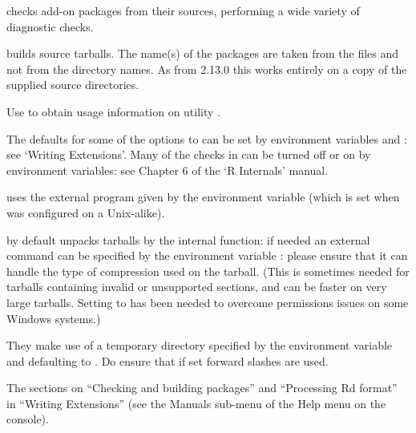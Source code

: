 %
\begin{Details}\relax
{}
checks \R{} add-on packages from their sources, performing a wide
variety of diagnostic checks.

 builds \R{} source tarballs.  The name(s) of the
packages are taken from the  files and not from the
directory names.  As from \R{} 2.13.0 this works entirely on a copy of
the supplied source directories.

Use  to obtain usage information on
utility .

The defaults for some of the options to  can be
set by environment variables  and
: see `Writing \R{} Extensions'.
Many of the checks in  can be turned off or on by
environment variables: see Chapter 6 of the `R Internals' manual.

 uses the external  program given by
the  environment variable (which is set when \R{} was
configured on a Unix-alike).

 by default unpacks tarballs by the internal
 function: if needed an external 
command can be specified by the environment variable
: please ensure that it can handle the type of
compression used on the tarball.  (This is sometimes needed for
tarballs containing invalid or unsupported sections, and can be faster
on very large tarballs.  Setting  to 
has been needed to overcome permissions issues on some Windows
systems.)
\end{Details}
%
\begin{Note}\relax
They make use of a temporary directory specified by the environment
variable  and defaulting to .  Do ensure
that if set forward slashes are used.
\end{Note}
%
\begin{SeeAlso}\relax
The sections on ``Checking and building packages'' and
``Processing Rd format'' in ``Writing \R{} Extensions''
(see the Manuals sub-menu of the Help menu on the console).
\end{SeeAlso}
